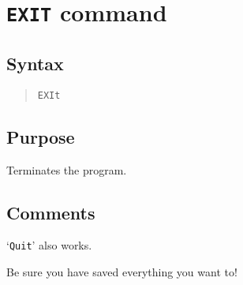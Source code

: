 %
%
%
%
\section{{\tt EXIT} command}
\subsection{Syntax}
\begin{verse}
{\tt EXIt}
\end{verse}
\subsection{Purpose}

Terminates the program.
\subsection{Comments}

`{\tt Quit}' also works.

Be sure you have saved everything you want to!

